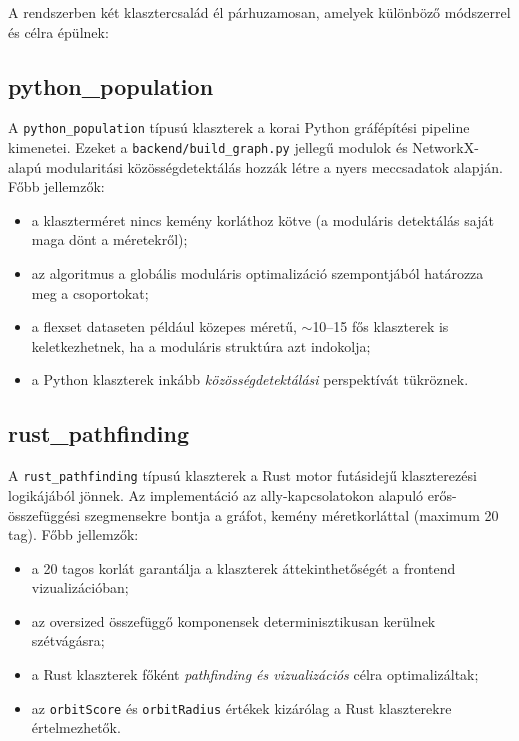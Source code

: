 A rendszerben két klasztercsalád él párhuzamosan, amelyek különböző módszerrel és célra épülnek:

\subsection{python\_population}

A \texttt{python\_population} típusú klaszterek a korai Python gráfépítési pipeline kimenetei. Ezeket a \texttt{backend/build\_graph.py} jellegű modulok és NetworkX-alapú modularitási közösségdetektálás hozzák létre a nyers meccsadatok alapján. Főbb jellemzők:

\begin{itemize}
    \item a klaszterméret nincs kemény korláthoz kötve (a moduláris detektálás saját maga dönt a méretekről);
    \item az algoritmus a globális moduláris optimalizáció szempontjából határozza meg a csoportokat;
    \item a flexset dataseten például közepes méretű, $\sim$10--15 fős klaszterek is keletkezhetnek, ha a moduláris struktúra azt indokolja;
    \item a Python klaszterek inkább \emph{közösségdetektálási} perspektívát tükröznek.
\end{itemize}

\subsection{rust\_pathfinding}

A \texttt{rust\_pathfinding} típusú klaszterek a Rust motor futásidejű klaszterezési logikájából jönnek. Az implementáció az ally-kapcsolatokon alapuló erős-összefüggési szegmensekre bontja a gráfot, kemény méretkorláttal (maximum 20 tag). Főbb jellemzők:

\begin{itemize}
    \item a 20 tagos korlát garantálja a klaszterek áttekinthetőségét a frontend vizualizációban;
    \item az oversized összefüggő komponensek determinisztikusan kerülnek szétvágásra;
    \item a Rust klaszterek főként \emph{pathfinding és vizualizációs} célra optimalizáltak;
    \item az \texttt{orbitScore} és \texttt{orbitRadius} értékek kizárólag a Rust klaszterekre értelmezhetők.
\end{itemize}

